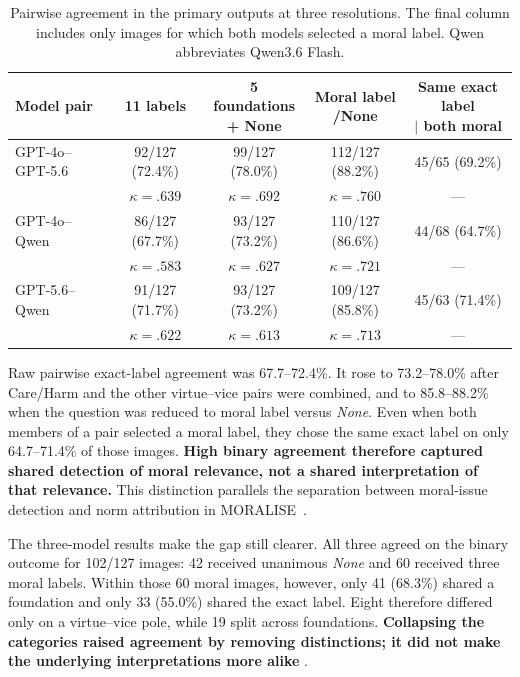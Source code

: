 \begin{table}[!htbp]
    \centering
    \caption{Pairwise agreement in the primary outputs at three resolutions.
    The final column includes only images for which both models selected a
    moral label. Qwen abbreviates Qwen3.6 Flash.}
    \label{tab:pairwise_agreement}
    \footnotesize
    \setlength{\tabcolsep}{5pt}
    \begin{tabular}{lcccc}
        \toprule
        Model pair & 11 labels & \shortstack{5 foundations\\+ None} &
        \shortstack{Moral label\\/None} &
        \shortstack{Same exact label\\\(\mid\) both moral} \\
        \midrule
        GPT-4o--GPT-5.6 & 92/127 (72.4\%) & 99/127 (78.0\%) &
        112/127 (88.2\%) & 45/65 (69.2\%) \\
        & \(\kappa=.639\) & \(\kappa=.692\) & \(\kappa=.760\) & --- \\
        \addlinespace[2pt]
        GPT-4o--Qwen & 86/127 (67.7\%) & 93/127 (73.2\%) &
        110/127 (86.6\%) & 44/68 (64.7\%) \\
        & \(\kappa=.583\) & \(\kappa=.627\) & \(\kappa=.721\) & --- \\
        \addlinespace[2pt]
        GPT-5.6--Qwen & 91/127 (71.7\%) & 93/127 (73.2\%) &
        109/127 (85.8\%) & 45/63 (71.4\%) \\
        & \(\kappa=.622\) & \(\kappa=.613\) & \(\kappa=.713\) & --- \\
        \bottomrule
    \end{tabular}
\end{table}

Raw pairwise exact-label agreement was 67.7--72.4\%. It rose to 73.2--78.0\%
after Care/Harm and the other virtue--vice pairs were combined, and to
85.8--88.2\% when the question was reduced to moral label versus
\textit{None}. Even when both members of a pair selected a moral label, they
chose the same exact label on only 64.7--71.4\% of those images. \textbf{High
binary agreement therefore captured shared detection of moral relevance, not
a shared interpretation of that relevance.} This distinction parallels the
separation between moral-issue detection and norm attribution in
MORALISE~\cite{lin2026moralise}.

The three-model results make the gap still clearer. All three agreed on the
binary outcome for 102/127 images: 42 received unanimous \textit{None} and 60
received three moral labels. Within those 60 moral images, however, only 41
(68.3\%) shared a foundation and only 33 (55.0\%) shared the exact label.
Eight therefore differed only on a virtue--vice pole, while 19 split across
foundations. \textbf{Collapsing the categories raised agreement by removing
distinctions; it did not make the underlying interpretations more alike}
\cite{jacobs2021measurement}.

